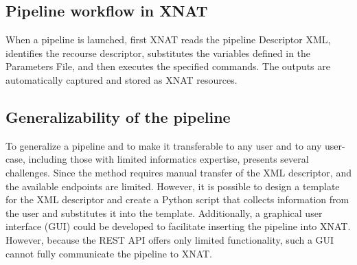 \subsection{Pipeline workflow in XNAT}
When a pipeline is launched, first XNAT reads the pipeline Descriptor XML, identifies the recourse descriptor, substitutes the variables defined in the Parameters File, and then executes the specified commands. The outputs are automatically captured and stored as XNAT resources.

\subsection{Generalizability of the pipeline}
\normalsize
To generalize a pipeline and to make it transferable to any user and to any user-case, including those with limited informatics expertise, presents several challenges.
Since the method requires manual transfer of the XML descriptor,  and the available endpoints are limited. 
However, it is possible to design a template for the XML descriptor and create a Python script that collects information from the user and substitutes it into the template. Additionally, a graphical user interface (GUI) could be developed to facilitate inserting the pipeline into XNAT. However, because the REST API offers only limited functionality, such a GUI cannot fully communicate the pipeline to XNAT.






